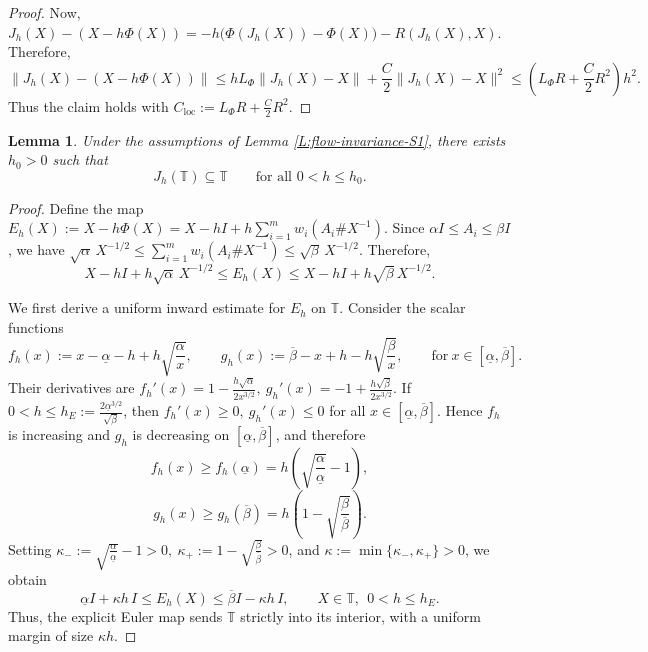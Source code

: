 \documentclass[12pt,reqno]{amsart}
\newtheorem{lemma}[theorem]{Lemma}
\begin{document}
\begin{proof}
Now,
$J_h(X) - (X - h \Phi(X))
= -h \bigl( \Phi(J_h(X)) - \Phi(X) \bigr) - R(J_h(X),X)$.
Therefore,
\[
\| J_h(X) - (X - h \Phi(X)) \|
\le
h L_\Phi \| J_h(X) - X \| + \frac{C}{2} \| J_h(X) - X \|^2
\le
\left( L_\Phi R + \frac{C}{2} R^2 \right) h^2.
\]
Thus the claim holds with
$C_{\mathrm{loc}} := L_\Phi R + \frac{C}{2} R^2$.
\end{proof}



\begin{lemma}
\label{L:uniform-trapping-normalized}
Under the assumptions of Lemma \ref{L:flow-invariance-S1},
there exists \( h_0 > 0 \) such that
\[
J_h(\mathbb{T}) \subseteq \mathbb{T}
\qquad\text{for all } 0 < h \le h_0.
\]
\end{lemma}

\begin{proof}
Define the map
$E_h(X) := X - h \Phi(X)
= X - hI + h \sum_{i=1}^m w_i (A_i \# X^{-1})$.
Since \( \alpha I \le A_i \le \beta I \), we have
$\sqrt{\alpha} \, X^{-1/2}
\le
\sum_{i=1}^m w_i (A_i \# X^{-1})
\le
\sqrt{\beta} \, X^{-1/2}$.
Therefore,
$$
X - hI + h \sqrt{\alpha} \, X^{-1/2} \leq E_h(X) \leq X - hI + h \sqrt{\beta} \, X^{-1/2}.
$$


We first derive a uniform inward estimate for \(E_h\) on \( \mathbb{T} \).
Consider the scalar functions
\[
f_h(x) := x - \underline{\alpha} - h + h \sqrt{\frac{\alpha}{x}},
\qquad
g_h(x) := \overline{\beta} - x + h - h \sqrt{\frac{\beta}{x}},
\qquad
\textrm{for} \ x \in [\underline{\alpha},\overline{\beta}].
\]
Their derivatives are
$
f_h'(x) = 1 - \frac{h\sqrt{\alpha}}{2x^{3/2}},
\
g_h'(x) = -1 + \frac{h\sqrt{\beta}}{2x^{3/2}}.
$
If
$0 < h \le h_E := \frac{2\underline{\alpha}^{3/2}}{\sqrt{\beta}}$,
then
$f_h'(x) \ge 0, \ g_h'(x) \le 0$
for all $x \in[\underline{\alpha},\overline{\beta}]$.
Hence \(f_h\) is increasing and \(g_h\) is decreasing on
\([\underline{\alpha},\overline{\beta}]\), and therefore
\[
f_h(x) \ge f_h(\underline{\alpha})
=
h \left( \sqrt{\frac{\alpha}{\underline{\alpha}}} - 1 \right),
\]
\[
g_h(x) \ge g_h(\overline{\beta})
=
h \left( 1 - \sqrt{\frac{\beta}{\overline{\beta}}} \right).
\]
Setting
$\kappa_- := \sqrt{\frac{\alpha}{\underline{\alpha}}} - 1 > 0,
\
\kappa_+ := 1 - \sqrt{\frac{\beta}{\overline{\beta}}} > 0$, and
$\kappa := \min \{ \kappa_-, \kappa_+ \} > 0$,
we obtain
\begin{equation} \label{E:bounds-E_h}
\underline{\alpha} I + \kappa h \, I \leq E_h(X) \leq \overline{\beta} I - \kappa h \, I,
\qquad
X \in \mathbb{T}, \ \ 0 < h \le h_E.
\end{equation}
Thus, the explicit Euler map sends \(\mathbb{T}\) strictly into its interior, with a uniform margin of size \( \kappa h \).


\end{proof}
\end{document}
